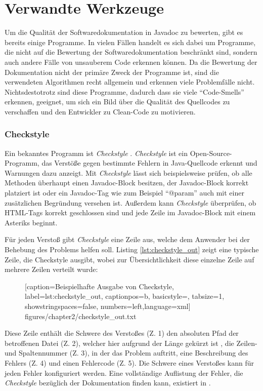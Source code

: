 \section{Verwandte Werkzeuge}\label{chapter:related_tools}
Um die Qualität der Softwaredokumentation in Javadoc zu bewerten, gibt es bereits einige Programme. In vielen Fällen handelt es sich dabei um Programme, die nicht auf die Bewertung der Softwaredokumentation beschränkt sind, sondern auch andere Fälle von unsauberem Code erkennen können. Da die Bewertung der Dokumentation nicht der primäre Zweck der Programme ist, sind die verwendeten Algorithmen recht allgemein und erkennen viele Problemfälle nicht. Nichtsdestotrotz sind diese Programme, dadurch dass sie viele \enquote{Code-Smells} erkennen, geeignet, um sich ein Bild über die Qualität des Quellcodes zu verschaffen und den Entwickler zu Clean-Code zu motivieren. 
\subsubsection{Checkstyle}
\newcommand{\cs}{\textit{Checkstyle }}
Ein bekanntes Programm ist \cs \cite{Checkstyle}. \cs ist ein Open-Source-Programm, das Verstöße gegen bestimmte Fehlern in Java-Quellcode erkennt und Warnungen dazu anzeigt.   Mit \cs lässt sich beispielsweise prüfen, ob alle Methoden überhaupt einen Javadoc-Block besitzen, der Javadoc-Block korrekt platziert ist oder ein Javadoc-Tag wie zum Beispiel \enquote{@param} auch mit einer zusätzlichen Begründung versehen ist. Außerdem kann  \cs überprüfen, ob \ac{HTML}-Tags korrekt geschlossen sind und jede Zeile im Javadoc-Block mit einem Asteriks beginnt.


Für jeden Verstoß gibt \cs  eine Zeile aus, welche dem Anwender bei der Behebung des Problems helfen soll. Listing \ref{lst:checkstyle_out} zeigt eine typische Zeile, die Checkstyle ausgibt, wobei zur Übersichtlichkeit diese einzelne Zeile auf mehrere Zeilen verteilt wurde:

	\begin{figure}[h!]
			
			[caption={Beispielhafte Ausgabe von Checkstyle},
			label={lst:checkstyle_out},
			captionpos=b, basicstyle=\footnotesize, tabsize=1, showstringspaces=false,  numbers=left,language=xml]
			{figures/chapter2/checkstyle_out.txt}
		\end{figure}
		
Diese Zeile enthält die Schwere des Verstoßes (Z. 1) den absoluten Pfad der betroffenen Datei (Z. 2), welcher hier aufgrund der Länge gekürzt ist , die Zeilen- und Spaltennummer (Z. 3), in der das Problem auftritt, eine Beschreibung des Fehlers (Z. 4) und einen Fehlercode (Z. 5). Die Schwere eines Verstoßes kann für jeden Fehler konfiguriert werden. Eine vollständige Auflistung der Fehler, die \cs bezüglich der Dokumentation finden kann,  existiert in \cite{checkstyle_doc_metrics}.

